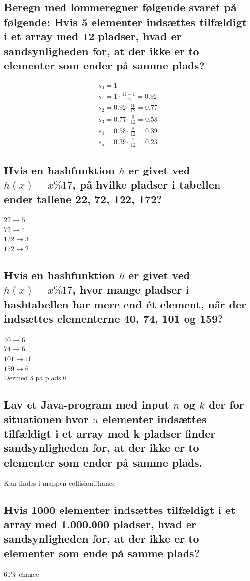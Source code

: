 \documentclass[12pt, a4paper]{article}
\begin{document}
		\subsection{Beregn med lommeregner følgende svaret på følgende: Hvis 5 elementer indsættes tilfældigt i et array med 12 pladser, hvad er sandsynligheden for, at der ikke er to elementer som ender på samme plads?}
			\begin{align*}
				s_0=1\\
				s_1=1\cdot \frac{12-1}{12}=0.92\\
				s_2=0.92\cdot \frac{10}{12}=0.77\\
				s_3=0.77\cdot \frac{9}{12}=0.58\\
				s_4=0.58\cdot \frac{8}{12}=0.39\\
				s_5=0.39\cdot \frac{7}{12}=0.23
			\end{align*}
		\setcounter{subsection}{0}
		\subsection{Hvis en hashfunktion $h$ er givet ved $h(x) = x \% 17$, på hvilke pladser i tabellen ender tallene 22, 72, 122, 172?}
			$22 \rightarrow 5$\\
			$72 \rightarrow 4$\\
			$122 \rightarrow 3$\\
			$172 \rightarrow 2$
		\subsection{Hvis en hashfunktion $h$ er givet ved $h(x) = x \% 17$, hvor mange pladser i hashtabellen har mere end ét element, når der indsættes elementerne 40, 74, 101 og 159?}
			$40 \rightarrow 6$\\
			$74 \rightarrow 6$\\
			$101 \rightarrow 16$\\
			$159 \rightarrow 6$\\
			Dermed 3 på plads 6
		\subsection{Lav et Java-program med input $n$ og $k$ der for situationen hvor $n$ elementer indsættes tilfældigt i et array med k pladser finder sandsynligheden for, at der ikke er to elementer som ender på samme plads.}
			Kan findes i mappen  collisionChance
		\subsection{Hvis 1000 elementer indsættes tilfældigt i et array med 1.000.000 pladser, hvad er sandsynligheden for, at der ikke er to elementer som ende på samme plads?}
			61\% chance
\end{document}
